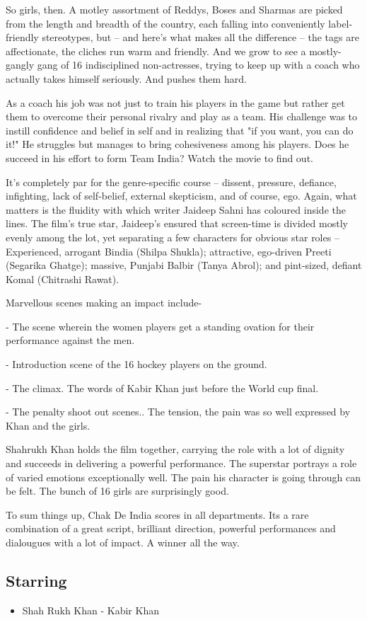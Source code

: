 \documentclass[11pt]{article} %
\begin{document}
So girls, then. A motley assortment of Reddys, Boses and Sharmas are picked from the length and breadth of the country, each falling into conveniently label-friendly stereotypes, but -- and here's what makes all the difference -- the tags are affectionate, the cliches run warm and friendly. And we grow to see a mostly-gangly gang of 16 indisciplined non-actresses, trying to keep up with a coach who actually takes himself seriously. And pushes them hard.

As a coach his job was not just to train his players in the game but rather get them to overcome their personal rivalry and play as a team. His challenge was to instill confidence and belief in self and in realizing that "if you want, you can do it!" He struggles but manages to bring cohesiveness among his players. Does he succeed in his effort to form Team India? Watch the movie to find out.

It's completely par for the genre-specific course -- dissent, pressure, defiance, infighting, lack of self-belief, external skepticism, and of course, ego. Again, what matters is the fluidity with which writer Jaideep Sahni has coloured inside the lines. The film's true star, Jaideep's ensured that screen-time is divided mostly evenly among the lot, yet separating a few characters for obvious star roles -- Experienced, arrogant Bindia (Shilpa Shukla); attractive, ego-driven Preeti (Segarika Ghatge); massive, Punjabi Balbir (Tanya Abrol); and pint-sized, defiant Komal (Chitrashi Rawat).

Marvellous scenes making an impact include-

- The scene wherein the women players get a standing ovation for their performance against the men.

- Introduction scene of the 16 hockey players on the ground.

- The climax. The words of Kabir Khan just before the World cup final.

- The penalty shoot out scenes.. The tension, the pain was so well expressed by Khan and the girls.

Shahrukh Khan holds the film together, carrying the role with a lot of dignity and succeeds in delivering a powerful performance. The superstar portrays a role of varied emotions exceptionally well. The pain his character is going through can be felt. The bunch of 16 girls are surprisingly good.

To sum things up, Chak De India scores in all departments. Its a rare combination of a great script, brilliant direction, powerful performances and dialougues with a lot of impact. A winner all the way.
\subsection{Starring}
\begin{itemize}
	\item Shah Rukh Khan - Kabir Khan
\end{itemize}
\end{document}

